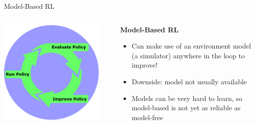 \documentclass[9pt]{beamer}
\begin{document}
\begin{frame}{Model-Based RL}


\begin{columns}
\begin{column}{0.33\textwidth}
\includegraphics[width=0.9\textwidth]{rl_loop}
\end{column}
\begin{column}{0.67\textwidth}
\textbf{Model-Based RL}
\begin{itemize}
\item Can make use of an environment model (a simulator) anywhere in the loop to improve!
\item Downside: model not usually available
\item Models can be very hard to learn, so model-based is not yet as reliable as model-free
\end{itemize}
\end{column}
\end{columns}
\end{frame}
\end{document}
